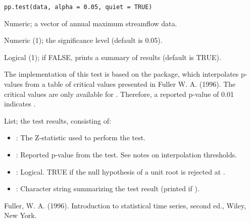 \documentclass[a4paper]{book}
\begin{document}
%
\begin{Usage}
\begin{verbatim}
pp.test(data, alpha = 0.05, quiet = TRUE)
\end{verbatim}
\end{Usage}
%
\begin{Arguments}
\begin{ldescription}
\item[\code{data}] Numeric; a vector of annual maximum streamflow data.

\item[\code{alpha}] Numeric (1); the significance level (default is 0.05).

\item[\code{quiet}] Logical (1); if FALSE, prints a summary of results (default is TRUE).
\end{ldescription}
\end{Arguments}
%
\begin{Details}
The implementation of this test is based on the  package, which interpolates
p-values from a table of critical values presented in Fuller W. A. (1996). The
critical values are only available for . Therefore, a reported
p-value of 0.01 indicates .
\end{Details}
%
\begin{Value}
List; the test results, consisting of:
\begin{itemize}

\item{} : The Z-statistic used to perform the test.
\item{} : Reported p-value from the test. See notes on interpolation thresholds.
\item{} : Logical. TRUE if the null hypothesis of a unit root is rejected at .
\item{} : Character string summarizing the test result (printed if ).

\end{itemize}

\end{Value}
%
\begin{References}
Fuller, W. A. (1996). Introduction to statistical time series, second ed., Wiley,
New York.
\end{References}
%
\begin{SeeAlso}
\end{SeeAlso}
\end{document}
